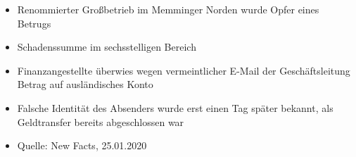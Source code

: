 \begin{frame}
\begin{itemize}
  \item Renommierter Großbetrieb im Memminger Norden wurde Opfer eines Betrugs
  \item Schadenssumme im sechsstelligen Bereich
  \item Finanzangestellte überwies wegen vermeintlicher E-Mail der Geschäftsleitung Betrag auf ausländisches Konto
  \item Falsche Identität des Absenders wurde erst einen Tag später bekannt, als Geldtransfer bereits abgeschlossen war
  \item Quelle: New Facts, 25.01.2020
\end{itemize}
\end{frame}


